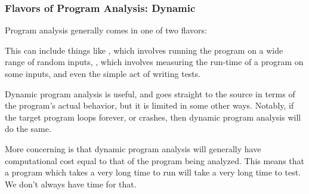 \documentclass[aspectratio=169, handout]{beamer}
\begin{document}
\begin{frame}[fragile]
  \frametitle{Flavors of Program Analysis: Dynamic}

  Program analysis generally comes in one of two flavors:

  \pause
  \vspace{\fill}


  \pause
  \vspace{\fill}

  This can include things like , which involves running
  the program on a wide range of random inputs, , which
  involves measuring the run-time of a program on some inputs, and even
  the simple act of writing tests.

  \pause
  \vspace{\fill}

  Dynamic program analysis is useful, and goes straight to the source
  in terms of the program's actual behavior, but it is limited in some
  other ways. Notably, if the target program loops forever, or
  crashes, then dynamic program analysis will do the same.

  \pause
  \vspace{\fill}

  More concerning is that dynamic program analysis will generally have
  computational cost equal to that of the program being analyzed. This
  means that a program which takes a very long time to run will take
  a very long time to test. We don't always have time for that.

\end{frame}
\end{document}
